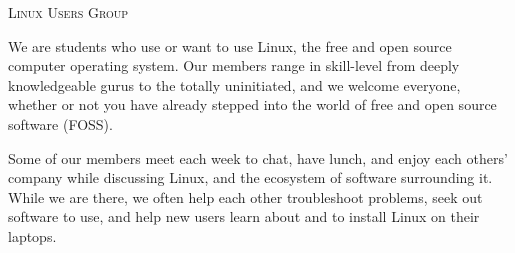 \documentclass[11pt]{article}
\newcommand{\foss}{FOSS}
\begin{document}
\begin{center} \scshape \LARGE
    Linux Users Group
    \vspace{0.5em}
\end{center}

We are students who use or want to use Linux, the free and open source computer
operating system. Our members range in skill-level from deeply knowledgeable
gurus to the totally uninitiated, and we welcome everyone, whether or not you
have already stepped into the world of free and open source software (\foss).

Some of our members meet each week to chat, have lunch, and enjoy each others'
company while discussing Linux, and the ecosystem of software surrounding it.
While we are there, we often help each other troubleshoot problems, seek out
software to use, and help new users learn about and to install Linux on their
laptops.
\end{document}
